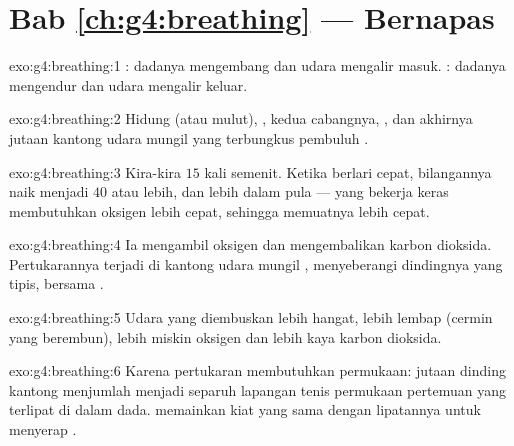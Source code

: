 \section*{Bab \ref{ch:g4:breathing} --- Bernapas}

\begin{solution}{exo:g4:breathing:1}
: dadanya mengembang dan udara mengalir masuk.
: dadanya mengendur dan udara mengalir keluar.
\end{solution}

\begin{solution}{exo:g4:breathing:2}
Hidung (atau mulut), , kedua cabangnya, , dan
akhirnya jutaan kantong udara mungil yang terbungkus pembuluh .
\end{solution}

\begin{solution}{exo:g4:breathing:3}
Kira-kira $15$ kali semenit. Ketika berlari cepat, bilangannya naik
menjadi $40$ atau lebih, dan lebih dalam pula ---  yang bekerja
keras membutuhkan oksigen lebih cepat, sehingga  memuatnya
lebih cepat.
\end{solution}

\begin{solution}{exo:g4:breathing:4}
Ia mengambil oksigen dan mengembalikan karbon dioksida. Pertukarannya
terjadi di kantong udara mungil , menyeberangi dindingnya
yang tipis, bersama .
\end{solution}

\begin{solution}{exo:g4:breathing:5}
Udara yang diembuskan lebih hangat, lebih lembap (cermin yang
berembun), lebih miskin oksigen dan lebih kaya karbon dioksida.
\end{solution}

\begin{solution}{exo:g4:breathing:6}
Karena pertukaran  membutuhkan permukaan: jutaan dinding
kantong menjumlah menjadi separuh lapangan tenis permukaan pertemuan
yang terlipat di dalam dada.  memainkan kiat yang sama
dengan lipatannya untuk menyerap .
\end{solution}

